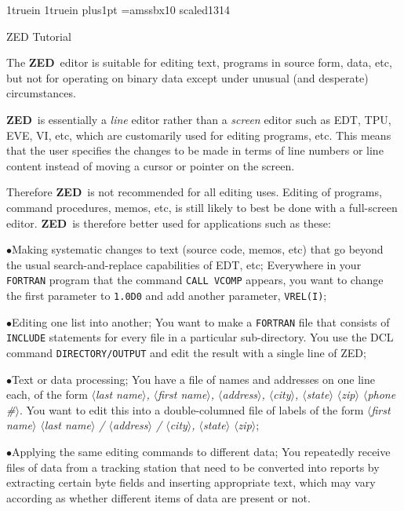 \magnification\magstephalf
\hoffset1truein
\voffset1truein
\parindent0pt
\parskip6pt plus1pt
\font\bfs=amssbx10 scaled1314
\centerline{\bfs ZED Tutorial}
\bigskip
{}
\def\<{$\langle$} \def\>{$\rangle$}
\def\sskip{\vskip1pt}
\def\section#1{\bigskip{\bf #1}}
\def\ZED{{\bf ZED}}
The \ZED\ editor is suitable for editing text, programs in source
form, data, etc, but not for operating on binary data except under
unusual (and desperate) circumstances.

\ZED\ is essentially a {\it line} editor rather than a {\it screen}
editor such as EDT, TPU, EVE, VI, etc, which are customarily used for
editing programs, etc.  This means that the user specifies the
changes to be made in terms of line numbers or line content instead
of moving a cursor or pointer on the screen.

Therefore \ZED\ is not recommended for all editing uses.  Editing
of programs, command procedures, memos, etc, is still likely to best
be done with a full-screen editor.  \ZED\ is therefore better used
for applications such as these:
\def\bullitem{\item{$\bullet$}}
\def\example{\hfil\break{\it Example: \ }}
{\narrower\parindent15pt

\bullitem Making systematic changes to text (source code, memos, etc)
that go beyond the usual search-and-replace capabilities of EDT, etc;
\example Everywhere in your {\tt FORTRAN} program that the command
{\tt CALL VCOMP} appears, you want to change the first parameter to
{\tt 1.0D0} and add another parameter, {\tt VREL(I)};

\bullitem Editing one list into another;
\example You want to make a {\tt FORTRAN} file that consists of
{\tt INCLUDE} statements for every file in a particular sub-directory.
You use the DCL command {\tt DIRECTORY/OUTPUT} and edit the result with a
single line of ZED;

\bullitem Text or data processing;
\example You have a file of names and addresses on one line each,
of the form {\it \<last name\>,
\<first name\>, \<address\>, \<city\>, \<state\> \<zip\> \<phone \#\>}.
You want to edit this into a double-columned file of labels of the form
{\it \<first name\> \<last name\> / \<address\> / \<city\>, \<state\> \<zip\>};

\bullitem Applying the same editing commands to different data;
\example You repeatedly receive files of data from a tracking station
that need to be converted into reports by extracting certain byte
fields and inserting appropriate text, which may vary according as
whether different items of data are present or not.

}

